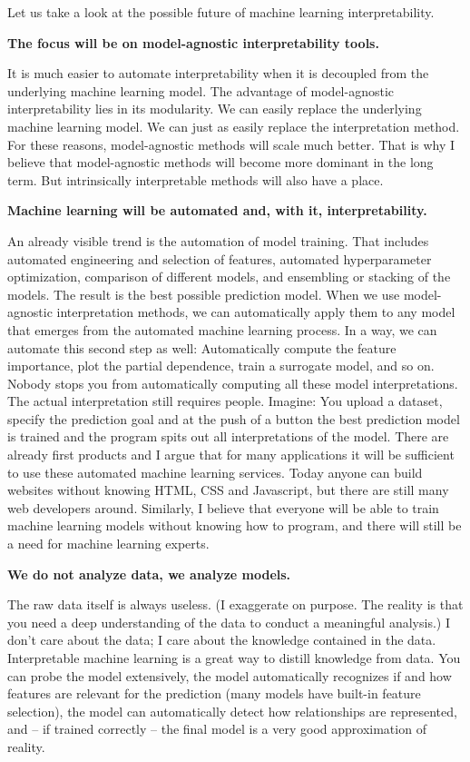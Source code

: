 \documentclass[12pt,]{krantz}
\begin{document}
Let us take a look at the possible future of machine learning
interpretability.

\textbf{The focus will be on model-agnostic interpretability tools.}

It is much easier to automate interpretability when it is decoupled from
the underlying machine learning model. The advantage of model-agnostic
interpretability lies in its modularity. We can easily replace the
underlying machine learning model. We can just as easily replace the
interpretation method. For these reasons, model-agnostic methods will
scale much better. That is why I believe that model-agnostic methods
will become more dominant in the long term. But intrinsically
interpretable methods will also have a place.

\textbf{Machine learning will be automated and, with it,
interpretability.}

An already visible trend is the automation of model training. That
includes automated engineering and selection of features, automated
hyperparameter optimization, comparison of different models, and
ensembling or stacking of the models. The result is the best possible
prediction model. When we use model-agnostic interpretation methods, we
can automatically apply them to any model that emerges from the
automated machine learning process. In a way, we can automate this
second step as well: Automatically compute the feature importance, plot
the partial dependence, train a surrogate model, and so on. Nobody stops
you from automatically computing all these model interpretations. The
actual interpretation still requires people. Imagine: You upload a
dataset, specify the prediction goal and at the push of a button the
best prediction model is trained and the program spits out all
interpretations of the model. There are already first products and I
argue that for many applications it will be sufficient to use these
automated machine learning services. Today anyone can build websites
without knowing HTML, CSS and Javascript, but there are still many web
developers around. Similarly, I believe that everyone will be able to
train machine learning models without knowing how to program, and there
will still be a need for machine learning experts.

\textbf{We do not analyze data, we analyze models.}

The raw data itself is always useless. (I exaggerate on purpose. The
reality is that you need a deep understanding of the data to conduct a
meaningful analysis.) I don't care about the data; I care about the
knowledge contained in the data. Interpretable machine learning is a
great way to distill knowledge from data. You can probe the model
extensively, the model automatically recognizes if and how features are
relevant for the prediction (many models have built-in feature
selection), the model can automatically detect how relationships are
represented, and -- if trained correctly -- the final model is a very
good approximation of reality.
\end{document}
